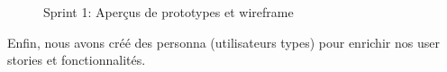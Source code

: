 \documentclass[t, 12pt, usenames,dvipsnames]{article}
\begin{document}
\begin{center}
\begin{figure}[h]
                        \hfill                        {}
                        \hfill
                        \caption{Sprint 1: Aperçus de prototypes et wireframe}
                        \label{fig:sprint1_protos}
                    \end{figure}
            \end{center}   
                
                \newpage
                
                \noindent Enfin, nous avons créé des personna (utilisateurs types) pour enrichir nos user stories et fonctionnalités.
                
\end{document}
